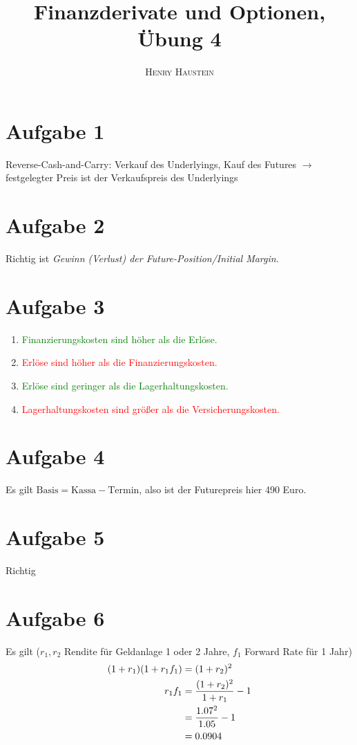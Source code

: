 \documentclass{article}
\title{\textbf{Finanzderivate und Optionen, Übung 4}}
\author{\textsc{Henry Haustein}}
\date{}
\begin{document}
	\maketitle
	
	\section*{Aufgabe 1}
	Reverse-Cash-and-Carry: Verkauf des Underlyings, Kauf des Futures $\to$ festgelegter Preis ist der Verkaufspreis des Underlyings

	\section*{Aufgabe 2}
	Richtig ist \textit{Gewinn (Verlust) der Future-Position/Initial Margin}.
	
	\section*{Aufgabe 3}
	\begin{enumerate}[label=(\alph*)]
		\item\textcolor{green}{Finanzierungskosten sind höher als die Erlöse.}
		\item\textcolor{red}{Erlöse sind höher als die Finanzierungskosten.}
		\item\textcolor{green}{Erlöse sind geringer als die Lagerhaltungskosten.}
		\item\textcolor{red}{Lagerhaltungskosten sind größer als die Versicherungskosten.}
	\end{enumerate}
	
	\section*{Aufgabe 4}
	Es gilt $\text{Basis} = \text{Kassa} - \text{Termin}$, also ist der Futurepreis hier 490 Euro.
	
	\section*{Aufgabe 5}
	Richtig
	
	\section*{Aufgabe 6}
	Es gilt ($r_1, r_2$ Rendite für Geldanlage 1 oder 2 Jahre, $f_1$ Forward Rate für 1 Jahr)
	\begin{align}
		(1+r_1)(1+r_1f_1) &= (1+r_2)^2 \notag \\
		r_1f_1 &= \frac{(1+r_2)^2}{1+r_1}-1 \notag \\
		&= \frac{1.07^2}{1.05}-1 \notag \\
		&= 0.0904 \notag
	\end{align}
	
\end{document}
